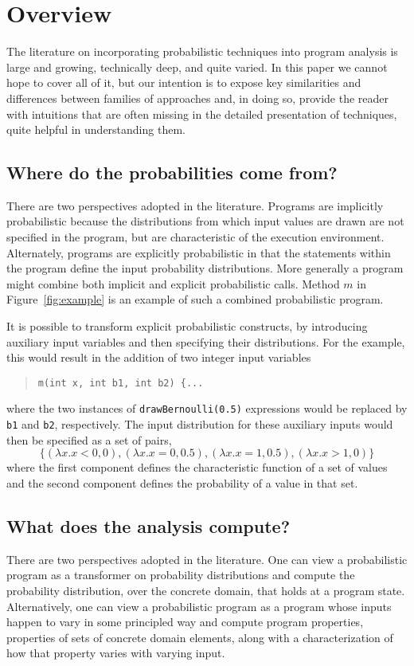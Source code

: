 \section{Overview}
\label{sec:overview}

The literature on incorporating probabilistic techniques into 
program analysis is large and growing, technically deep, and quite
varied.  In this paper we cannot hope to cover all of it, but our
intention is to expose key similarities and differences between 
families of approaches and, in doing so, provide the reader with
intuitions that are often missing in the detailed presentation of
techniques, quite helpful in understanding them.

\subsection{Where do the probabilities come from?}
There are two perspectives adopted in the literature.
Programs are implicitly probabilistic because the distributions
from which input values are drawn are not specified in the program,
but are characteristic of the execution environment.
Alternately, programs are explicitly probabilistic in that the statements
within the program define the input probability distributions.
More generally a program might combine both implicit and explicit
probabilistic calls.  Method $m$ in Figure~\ref{fig:example}
is an example of such a combined probabilistic program.

It is possible to transform explicit probabilistic constructs,
by introducing auxiliary input variables and then specifying
their distributions.   For the example, this would result
in the addition of two integer input variables 
\begin{quote}
\texttt{m(int x, int b1, int b2) \{...} 
\end{quote}
where the two instances of
\texttt{drawBernoulli(0.5)} expressions would be replaced
by \texttt{b1} and \texttt{b2}, respectively.  The input
distribution for these auxiliary inputs would then be specified
as a set of pairs,
\[
\{ (\lambda x.x<0,0), (\lambda x.x=0,0.5), (\lambda x.x=1,0.5), (\lambda x.x>1,0) \}
\]
where the first component defines the characteristic function
of a set of values and the second component defines the probability
of a value in that set.

\subsection{What does the analysis compute?}
There are two perspectives adopted in the literature.
One can view a probabilistic program as a transformer on probability
distributions and compute the probability distribution, over the
concrete domain, that holds at a program state.
Alternatively, one can view a probabilistic program as a program whose inputs happen
to vary in some principled way and compute program properties, 
properties of sets of concrete domain elements, along with a characterization
of how that property varies with varying input.

